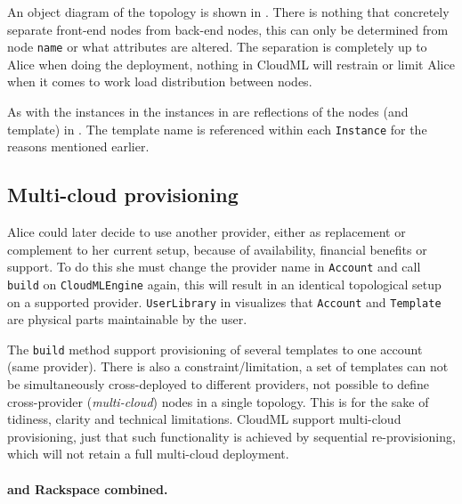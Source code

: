 An object diagram of the topology is shown in .
There is nothing that concretely separate front-end nodes from back-end nodes,
this can only be determined from node \texttt{name} or what attributes are altered.
The separation is completely up to Alice when doing the deployment,
\ie nothing in CloudML will restrain or limit Alice 
when it comes to work load distribution between nodes.

As with the instances in  the instances in 
are reflections of the nodes (and template) in .
The template name is referenced within each \texttt{Instance} 
for the reasons mentioned earlier.

\subsection{Multi-cloud provisioning}

Alice could later decide to use another provider, either as replacement or complement to her current setup,
because of availability, financial benefits or support.
To do this she must change the provider name in \texttt{Account} and call \texttt{build} on \texttt{CloudMLEngine} again,
this will result in an identical topological setup on a supported provider.
\texttt{UserLibrary} in  visualizes that \texttt{Account} and \texttt{Template} are 
physical parts maintainable by the user.

The \texttt{build} method support provisioning of several templates to one account (same provider).
There is also a constraint/limitation, a set of templates can not be simultaneously 
cross-deployed to different providers,
\ie not possible to define cross-provider (\emph{multi-cloud}) nodes in a single topology.
This is for the sake of tidiness, clarity and technical limitations.
CloudML support multi-cloud provisioning,
just that such functionality is achieved by sequential re-provisioning,
which will not retain a full multi-cloud deployment.

\paragraph{ and Rackspace combined.}


